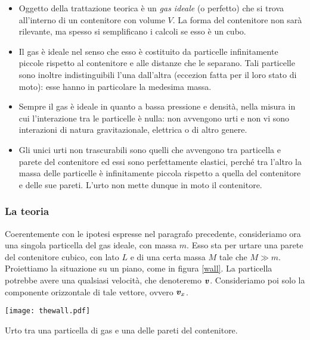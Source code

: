 \begin{itemize}
    \item Oggetto della trattazione teorica è un \textit{gas ideale}
    (o perfetto) che si trova all'interno di un contenitore con
    volume $V$. La forma del contenitore non sarà rilevante, ma spesso
    si semplificano i calcoli se esso è un cubo.

    \item Il gas è ideale nel senso che esso è costituito da particelle
    infinitamente piccole rispetto al contenitore e alle distanze che
    le separano. Tali particelle sono inoltre indistinguibili l'una
    dall'altra (eccezion fatta per il loro stato di moto): esse hanno
    in particolare la medesima massa.

    \item Sempre il gas è ideale in quanto a bassa pressione e densità,
    nella misura in cui l'interazione tra le particelle è nulla: non
    avvengono urti e non vi sono interazioni di natura gravitazionale,
    elettrica o di altro genere.

    \item Gli unici urti non trascurabili sono quelli che avvengono
    tra particella e parete del contenitore ed essi sono perfettamente
    elastici, perché tra l'altro la massa delle particelle è infinitamente
    piccola rispetto a quella del contenitore e delle sue pareti. L'urto
    non mette dunque in moto il contenitore.
\end{itemize}

\subsubsection*{La teoria}
Coerentemente con le ipotesi espresse nel paragrafo precedente,
consideriamo ora una singola particella del gas ideale, con massa
$m$. Esso sta per urtare una parete del contenitore cubico, con
lato $L$ e di una certa massa $M$ tale che $M \gg m$. Proiettiamo la situazione su un piano, come in figura
\ref{wall}. La particella potrebbe avere una qualsiasi velocità,
che denoteremo $\textbf{\textit{v}}$. Consideriamo poi solo la componente
orizzontale di tale vettore, ovvero $\textbf{\textit{v}}_x$.

\begin{marginfigure}
    \centering
    \texttt{[image: thewall.pdf]}
    \caption{Urto tra una particella di gas e una delle pareti
    del contenitore.}
    \label{wall}
\end{marginfigure}

